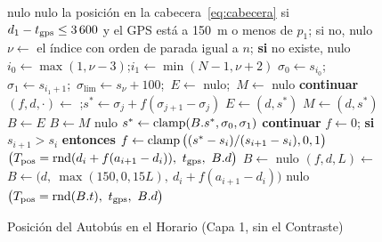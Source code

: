 \begin{figure}[ht]
\caption{Posición del Autobús en el Horario (Capa 1, sin el Contraste)}\label{alg:posicion}
\begin{algorithmic}[1]
   \Return nulo \EndIf
   \Return nulo \EndIf
   \Return la posición en la cabecera~\eqref{eq:cabecera} si $d_1-t_{\mathrm{gps}}\le3\,600$ y el GPS está a 150~m o menos de $p_1$; si no, nulo \EndIf
  \State $\nu\gets$ el índice con orden de parada igual a $n$; \textbf{si} no existe, \Return nulo
  \State $i_0\gets\max(1,\nu-3)$;\quad $i_1\gets\min(N-1,\nu+2)$
    \State $\sigma_0\gets s_{i_0}$;\ $\sigma_1\gets s_{i_1+1}$;\ $\sigma_{\lim}\gets s_\nu+100$;\ $E\gets$ nulo;\ $M\gets$ nulo
     
       \textbf{continuar} \EndIf
      \State $(f,d,\cdot)\gets$ ;\quad $s^\ast\gets\sigma_j+f(\sigma_{j+1}-\sigma_j)$
         $E\gets(d,s^\ast)$ \EndIf
       $M\gets(d,s^\ast)$
      \EndIf
    \EndFor
    \State $B\gets E$
     $B\gets M$ \EndIf
     \Return nulo \EndIf
    \State $s^\ast\gets\operatorname{clamp}(B.s^\ast,\sigma_0,\sigma_1)$
       \textbf{continuar} \EndIf
      \State $f\gets0$; \textbf{si} $s_{i+1}>s_i$ \textbf{entonces} $f\gets\operatorname{clamp}\big((s^\ast-s_i)/(s_{i+1}-s_i),0,1\big)$
      \State \Return $\big(\Tpos=\redondeo(d_i+f(a_{i+1}-d_i)),\ \tgps,\ B.d\big)$
    \EndFor
  \Else {}
    \State $B\gets$ nulo
      \State $(f,d,L)\gets$ 
       $B\gets\big(d,\ \max(150,0{,}15L),\ d_i+f(a_{i+1}-d_i)\big)$ \EndIf
    \EndFor
     \Return nulo \EndIf
    \State \Return $\big(\Tpos=\redondeo(B.t),\ \tgps,\ B.d\big)$
  \EndIf
\EndFunction
\end{algorithmic}
\end{figure}

